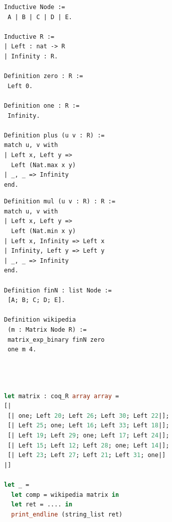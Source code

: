 \documentclass[a4paper,UKenglish,cleveref, autoref, thm-restate, anonymous]{lipics-v2021}
\begin{document}
\begin{minipage}{0.45\linewidth}{\vspace{5mm}}
\begin{lstlisting}[language=Coq]
Inductive Node := 
 A | B | C | D | E. 

Inductive R :=
| Left : nat -> R
| Infinity : R.
  
Definition zero : R := 
 Left 0.

Definition one : R := 
 Infinity.

Definition plus (u v : R) :=
match u, v with 
| Left x, Left y => 
  Left (Nat.max x y) 
| _, _ => Infinity
end.
\end{lstlisting}
\end{minipage}
\hspace{2mm}
\begin{minipage}{0.5\linewidth}{\vspace{3mm}}
\begin{lstlisting}[language=Coq]
Definition mul (u v : R) : R :=
match u, v with 
| Left x, Left y => 
  Left (Nat.min x y)
| Left x, Infinity => Left x 
| Infinity, Left y => Left y 
| _, _ => Infinity 
end.

Definition finN : list Node :=
 [A; B; C; D; E].

Definition wikipedia 
 (m : Matrix Node R) :=
 matrix_exp_binary finN zero 
 one m 4.


 
\end{lstlisting}
\end{minipage}
\label{fig:coq}
\begin{center}
\begin{minipage}[t]{0.7\linewidth}{\vspace{- 3.9mm}}
\begin{lstlisting}[language=Caml]
let matrix : coq_R array array = 
[|
 [| one; Left 20; Left 26; Left 30; Left 22|];
 [| Left 25; one; Left 16; Left 33; Left 18|];
 [| Left 19; Left 29; one; Left 17; Left 24|];
 [| Left 15; Left 12; Left 28; one; Left 14|];
 [| Left 23; Left 27; Left 21; Left 31; one|]
|]

let _ = 
  let comp = wikipedia matrix in 
  let ret = .... in 
  print_endline (string_list ret)
\end{lstlisting}
\end{minipage}
\end{center}
\label{fig:ocaml} 
\end{document}
